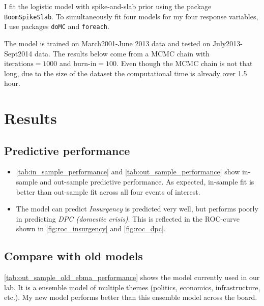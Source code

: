 \documentclass[a0,portrait]{a0poster}
\begin{document}
\begin{multicols}{2}
I fit the logistic model with spike-and-slab prior using the package \verb|BoomSpikeSlab|. To simultaneously fit four models for my four response variables, I use packages \verb|doMC| and \verb|foreach|. 

The model is trained on March2001-June 2013 data and tested on July2013-Sept2014 data. The results below come from a MCMC chain with $\text{iterations}=1000$ and $\text{burn-in}=100$. Even though the MCMC chain is not that long, due to the size of the dataset the computational time is already over 1.5 hour. 


\section*{Results}

\subsection*{Predictive performance}
\begin{itemize}
\item \autoref{tab:in_sample_performance} and \autoref{tab:out_sample_performance} show in-sample and out-sample predictive performance. As expected, in-sample fit is better than out-sample fit across all four events of interest.

\item The model can predict \textit{Insurgency} is predicted very well, but performs poorly in predicting \textit{DPC (domestic crisis)}. This is reflected in the ROC-curve shown in \autoref{fig:roc_insurgency} and \autoref{fig:roc_dpc}.
\end{itemize}

\begin{center}

\label{tab:in_sample_performance}
\end{center}
%

\begin{center}

\label{tab:out_sample_performance}
\end{center}

\subsection*{Compare with old models}

\autoref{tab:out_sample_old_ebma_performance} shows the model currently used in our lab. It is a ensemble model of multiple themes (politics, economics, infrastructure, etc.). My new model performs better than this ensemble model across the board.  
\begin{center}

\label{tab:out_sample_old_ebma_performance}
\end{center}


\end{multicols}
\end{document}
